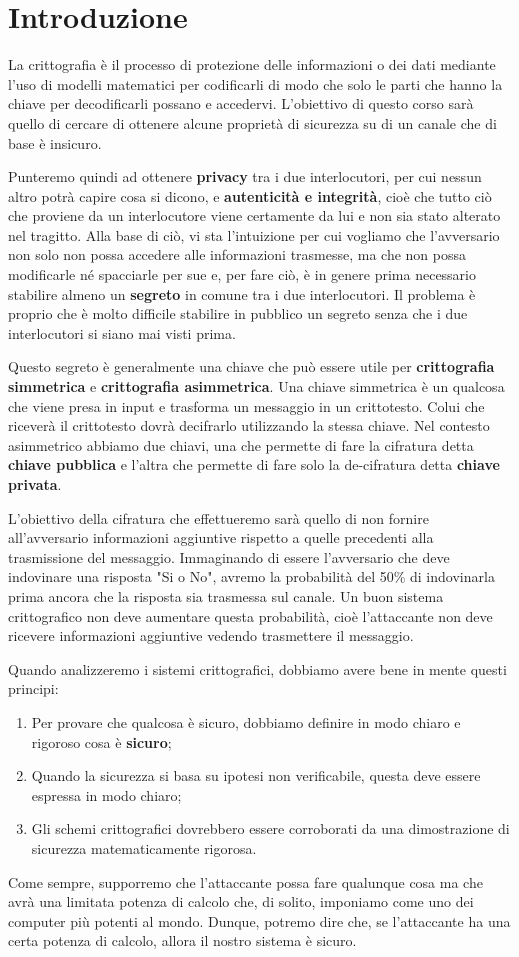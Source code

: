 \chapter*{Introduzione}
La crittografia è il processo di protezione delle informazioni o dei dati mediante l'uso di modelli matematici per codificarli di modo che solo le parti che hanno la chiave per decodificarli possano e accedervi.
L'obiettivo di questo corso sarà quello di cercare di ottenere alcune proprietà di sicurezza su di un canale che di base è insicuro.

Punteremo quindi ad ottenere \textbf{privacy} tra i due interlocutori, per cui nessun altro potrà capire cosa si dicono, e \textbf{autenticità e integrità}, cioè che tutto ciò che proviene da un interlocutore viene certamente da lui e non sia stato alterato nel tragitto. Alla base di ciò, vi sta l'intuizione per cui vogliamo che l'avversario non solo non possa accedere alle informazioni trasmesse, ma che non possa modificarle né spacciarle per sue e, per fare ciò, è in genere prima necessario stabilire almeno un \textbf{segreto} in comune tra i due interlocutori. Il problema è proprio che è molto difficile stabilire in pubblico un segreto senza che i due interlocutori si siano mai visti prima.

Questo segreto è generalmente una chiave che può essere utile per \textbf{crittografia simmetrica} e \textbf{crittografia asimmetrica}. Una chiave simmetrica è un qualcosa che viene presa in input e trasforma un messaggio in un crittotesto. Colui che riceverà il crittotesto dovrà decifrarlo utilizzando la stessa chiave. 
Nel contesto asimmetrico abbiamo due chiavi, una che permette di fare la cifratura detta \textbf{chiave pubblica} e l'altra che permette di fare solo la de-cifratura detta \textbf{chiave privata}. 

L'obiettivo della cifratura che effettueremo sarà quello di non fornire all'avversario informazioni aggiuntive rispetto a quelle precedenti alla trasmissione del messaggio. Immaginando di essere l'avversario che deve indovinare una risposta "Si o No", avremo la probabilità del 50\% di indovinarla prima ancora che la risposta sia trasmessa sul canale. Un buon sistema crittografico non deve aumentare questa probabilità, cioè l'attaccante non deve ricevere informazioni aggiuntive vedendo trasmettere il messaggio.

Quando analizzeremo i sistemi crittografici, dobbiamo avere bene in mente questi principi:
\begin{enumerate}
    \item Per provare che qualcosa è sicuro, dobbiamo definire in modo chiaro e rigoroso cosa è \textbf{sicuro};
    \item Quando la sicurezza si basa su ipotesi non verificabile, questa deve essere espressa in modo chiaro;
    \item Gli schemi crittografici dovrebbero essere corroborati da una dimostrazione di sicurezza matematicamente rigorosa.
\end{enumerate}

Come sempre, supporremo che l'attaccante possa fare qualunque cosa ma che avrà una limitata potenza di calcolo che, di solito, imponiamo come uno dei computer più potenti al mondo. Dunque, potremo dire che, se l'attaccante ha una certa potenza di calcolo, allora il nostro sistema è sicuro.

